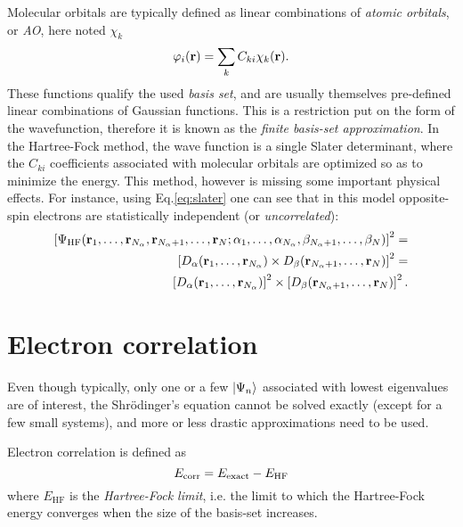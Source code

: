\documentclass[./thesis.tex]{subfiles}
\begin{document}
Molecular orbitals are typically defined as linear combinations of \emph{atomic orbitals}, or \emph{AO}, here noted $\chi_k$
\begin{equation}
 \varphi_i({\bf r}) = \sum_k C_{ki} \chi_k({\bf r}).
\end{equation}
These functions qualify the used \emph{basis set}, and are usually themselves pre-defined linear combinations of Gaussian functions. This is a restriction put on the form of the wavefunction, therefore it is known as the \emph{finite basis-set approximation}.
In the Hartree-Fock method, the wave function is a single Slater determinant, where the $C_{ki}$ coefficients associated with molecular orbitals are optimized so as to minimize the energy. This method, however is missing some important physical effects. For instance, using Eq.\eqref{eq:slater} one can see that in this model opposite-spin electrons are statistically independent (or \emph{uncorrelated}):
\begin{equation}
\begin{split}
\left[ \Psi_\textrm{HF}({\bf r}_1,\dots,{\bf r}_{{N_\alpha}},{\bf r}_{{N_\alpha}+1},\dots,{\bf r}_N;
      \alpha_1,\dots,\alpha_{{N_\alpha}},\beta_{{N_\alpha}+1},\dots,\beta_N) \right]^2 = \\
\left[ D_\alpha({\bf r}_1,\dots,{\bf r}_{{N_\alpha}}) \times D_\beta({\bf r}_{{N_\alpha}+1},\dots,{\bf r}_N) \right]^2 = \\
\left[ D_\alpha({\bf r}_1,\dots,{\bf r}_{{N_\alpha}}) \right]^2 \times \left[ D_\beta({\bf r}_{{N_\alpha}+1},\dots,{\bf r}_N) \right]^2.
\end{split}
\end{equation}

\section{Electron correlation}
Even though typically, only one or a few $\ket{\Psi_n}$ associated with lowest eigenvalues are of interest, the Shrödinger's equation cannot be solved exactly (except for a few small systems), and more or less drastic approximations need to be used. 

Electron correlation is defined as\cite{Lowdin_1959}
\begin{equation}
E_\text{corr} = E_\text{exact} - E_\text{HF}
\end{equation}
where $E_\text{HF}$ is the \emph{Hartree-Fock limit}, i.e. the limit to which the Hartree-Fock energy converges when the size of the basis-set increases.
\end{document}
